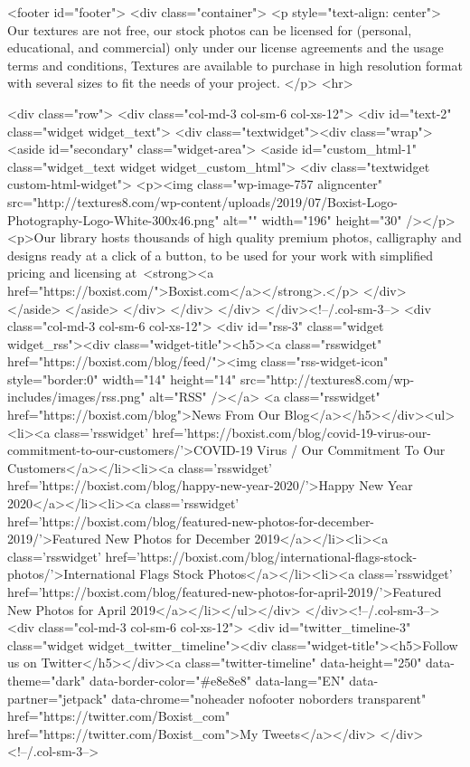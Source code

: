 	<footer id="footer">
		<div class="container">
		    <p style="text-align: center">
Our textures are not free, our stock photos can be licensed for (personal, educational, and commercial) only under our license agreements and the usage terms and conditions, Textures are available to purchase in high resolution format with several sizes to fit the needs of your project.
</p>
<hr>

			<div class="row">
								<div class="col-md-3 col-sm-6 col-xs-12">
					<div id="text-2" class="widget widget_text">			<div class="textwidget"><div class="wrap">
<aside id="secondary" class="widget-area">
<aside id="custom_html-1" class="widget_text widget widget_custom_html">
<div class="textwidget custom-html-widget">
<p><img class="wp-image-757 aligncenter" src="http://textures8.com/wp-content/uploads/2019/07/Boxist-Logo-Photography-Logo-White-300x46.png" alt="" width="196" height="30" /></p>
<p>Our library hosts thousands of high quality premium photos, calligraphy and designs ready at a click of a button, to be used for your work with simplified pricing and licensing at <strong><a href="https://boxist.com/">Boxist.com</a></strong>.</p>
</div>
</aside>
</aside>
</div>
</div>
		</div>				</div><!--/.col-sm-3-->
				<div class="col-md-3 col-sm-6 col-xs-12">
					<div id="rss-3" class="widget widget_rss"><div class="widget-title"><h5><a class="rsswidget" href="https://boxist.com/blog/feed/"><img class="rss-widget-icon" style="border:0" width="14" height="14" src="http://textures8.com/wp-includes/images/rss.png" alt="RSS" /></a> <a class="rsswidget" href="https://boxist.com/blog">News From Our Blog</a></h5></div><ul><li><a class='rsswidget' href='https://boxist.com/blog/covid-19-virus-our-commitment-to-our-customers/'>COVID-19 Virus / Our Commitment To Our Customers</a></li><li><a class='rsswidget' href='https://boxist.com/blog/happy-new-year-2020/'>Happy New Year 2020</a></li><li><a class='rsswidget' href='https://boxist.com/blog/featured-new-photos-for-december-2019/'>Featured New Photos for December 2019</a></li><li><a class='rsswidget' href='https://boxist.com/blog/international-flags-stock-photos/'>International Flags Stock Photos</a></li><li><a class='rsswidget' href='https://boxist.com/blog/featured-new-photos-for-april-2019/'>Featured New Photos for April 2019</a></li></ul></div>				</div><!--/.col-sm-3-->
				<div class="col-md-3 col-sm-6 col-xs-12">
					<div id="twitter_timeline-3" class="widget widget_twitter_timeline"><div class="widget-title"><h5>Follow us on Twitter</h5></div><a class="twitter-timeline" data-height="250" data-theme="dark" data-border-color="#e8e8e8" data-lang="EN" data-partner="jetpack" data-chrome="noheader nofooter noborders transparent" href="https://twitter.com/Boxist_com" href="https://twitter.com/Boxist_com">My Tweets</a></div>				</div><!--/.col-sm-3-->
